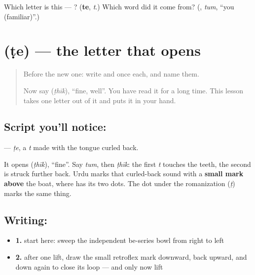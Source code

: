 \begin{tcolorbox}[breakable,colback=teal!4,colframe=teal!35!black,title={Before you move on}]
Which letter is this — ? (\textbf{te}, \emph{t}.) Which word did it come from? (\textbf{}, \emph{tum}, \textquotedblleft{}you (familiar)\textquotedblright{}.)
\end{tcolorbox}
\section[\texorpdfstring{\ur{ٹ} (ṭe)}{ٹ (ṭe)}]{ (ṭe) — the letter that opens }

\label{lesson:UR-W34-tte}



\begin{quote}
Before the new one: write  and  once each, and name them.

Now say \textbf{} (\emph{ṭhīk}), \textquotedblleft{}fine, well\textquotedblright{}. You have read it for a long time. This lesson takes one letter out of it and puts it in your hand.
\end{quote}

\subsection*{Script you'll notice: }
\textbf{} — \emph{ṭe}, a \emph{t} made with the tongue curled back.

It opens \textbf{} (\emph{ṭhīk}), \textquotedblleft{}fine\textquotedblright{}. Say \emph{tum}, then \emph{ṭhīk}: the first \emph{t} touches the teeth, the second is struck further back. Urdu marks that curled-back sound with a \textbf{small mark above} the boat, where \textbf{} has its two dots. The dot under the romanization (\emph{ṭ}) marks the same thing.

\subsection*{Writing: }

\begin{itemize}
\raggedright
  \item \textbf{1.} start here: sweep the independent be-series bowl from right to left
  \item \textbf{2.} after one lift, draw the small retroflex mark downward, back upward, and down again to close its loop — and only now lift
\end{itemize}


